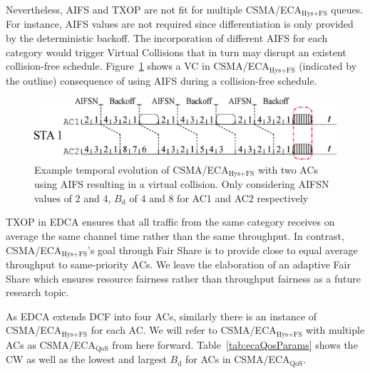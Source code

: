 Nevertheless, AIFS and TXOP are not fit for multiple CSMA/ECA$_{\text{Hys+FS}}$ queues. For instance, AIFS values are not required since differentiation is only provided by the deterministic backoff. The incorporation of different AIFS for each category would trigger Virtual Collisions that in turn may disrupt an existent collision-free schedule. Figure~\ref{fig:AIFSinECA} shows a VC in CSMA/ECA$_{\text{Hys+FS}}$ (indicated by the outline) consequence of using AIFS during a collision-free schedule.

	\begin{figure}[tb]
	\centering
		\includegraphics[width=\linewidth]{figures/AIFSwithECA.eps}
		\caption{Example temporal evolution of CSMA/ECA$_{\text{Hys+FS}}$ with two ACs using AIFS resulting in a virtual collision. Only considering AIFSN values of 2 and 4, $B_{\text{d}}$ of 4 and 8 for AC1 and AC2 respectively}
		\label{fig:AIFSinECA}
	\end{figure}


TXOP in EDCA ensures that all traffic from the same category receives on average the same channel time rather than the same throughput. In contrast, CSMA/ECA$_{\text{Hys+FS}}$'s goal through Fair Share is to provide close to equal average throughput to same-priority ACs. We leave the elaboration of an adaptive Fair Share which ensures resource fairness rather than throughput fairness as a future research topic.

As EDCA extends DCF into four ACs, similarly there is an instance of CSMA/ECA$_{\text{Hys+FS}}$ for each AC. We will refer to CSMA/ECA$_{\text{Hys+FS}}$ with multiple ACs as CSMA/ECA$_{\text{QoS}}$ from here forward. Table~\ref{tab:ecaQosParams} shows the CW as well as the lowest and largest $B_{\text{d}}$ for ACs in CSMA/ECA$_{\text{QoS}}$.

